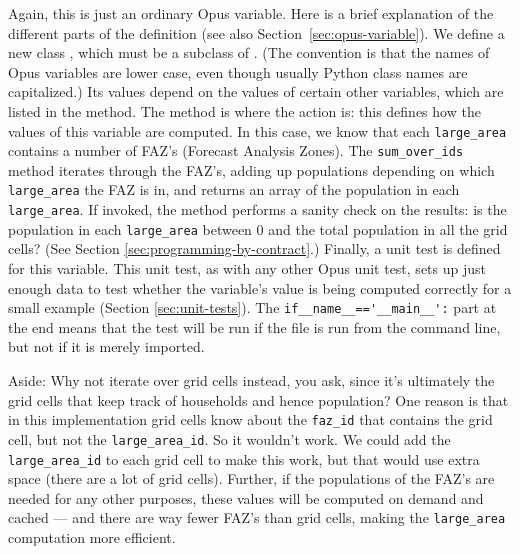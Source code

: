 Again, this is just an ordinary Opus variable. \variablesindex Here
is a brief explanation of the different parts of the definition (see
also Section~\ref{sec:opus-variable}).  We define a new class
, which must be a subclass of .
\variablesindex (The convention is that the names of Opus variables
\variablesindex are lower case, even though usually Python
\pythonindex class names are capitalized.)  Its values depend on the
values of certain other variables, \variablesindex which are listed
in the  method.  The  method is
where the action is: this defines how the values of this variable
\variablesindex are computed.  In this case, we know that each
\verb|large_area| contains a number of FAZ's (Forecast Analysis
Zones). \fazindex The \verb|sum_over_ids| method iterates through
the FAZ's, \fazindex adding up populations depending on which
\verb|large_area| the FAZ \fazindex is in, and returns an array of
the population in each \verb|large_area|.  If invoked, the
 method performs a sanity check on the results:
is the population in each \verb|large_area| between 0 and the total
population in all the grid cells?  (See Section
\ref{sec:programming-by-contract}.)  Finally, a unit test is defined
for this variable. \variablesindex This unit test, as with any other
Opus unit test, sets up just enough data to test whether the
variable's \variablesindex value is being computed correctly for a
small example (Section \ref{sec:unit-tests}). The
\verb|if__name__=='__main__':| part at the end means that the test
will be run if the file is run from the command line, but not if it
is merely imported.

Aside: Why not iterate over grid cells instead, you ask, since it's
ultimately the grid cells that keep track of households and hence
population?  One reason is that in this implementation grid cells
know about the \verb|faz_id| \fazindex that contains the grid cell,
but not the \verb|large_area_id|\@.  So it wouldn't work.  We could
add the \verb|large_area_id| to each grid cell to make this work,
but that would use extra space (there are a lot of grid cells).
Further, if the populations of the FAZ's \fazindex are needed for
any other purposes, these values will be computed on demand and
cached
--- and there are way fewer FAZ's \fazindex than grid cells, making
the \verb|large_area| computation more efficient.

